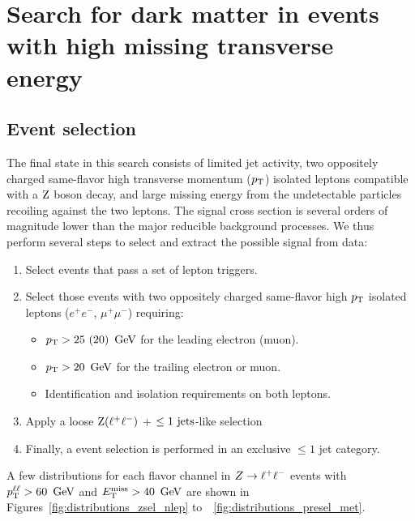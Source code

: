 \chapter{Search for dark matter in events with high missing transverse energy}
\section{Event selection}
The final state in this search consists of limited jet activity, 
two oppositely charged same-flavor high transverse momentum ($p_{\mathrm{T}}$) isolated leptons
compatible with a $\mathrm{Z}$ boson decay, and large missing energy from the undetectable
particles recoiling against the two leptons.
The signal cross section is several orders of magnitude lower than the major reducible
background processes. We thus perform several steps to select and extract the
possible signal from data:
\begin{enumerate}
  \setlength\itemsep{0em}
    \item Select events that pass a set of lepton triggers.
    \item Select those events with two oppositely charged same-flavor high
    $p_{\mathrm{T}}$ isolated leptons ($e^+ e^-$, $\mu^+ \mu^-$) requiring:
      \begin{itemize}
          \setlength\itemsep{0em}
    	  \item $p_{\mathrm{T}}>25\ (20)~\,\text{Ge\hspace{-.08em}V}$ for the leading electron (muon).
    	  \item $p_{\mathrm{T}}>20~\,\text{Ge\hspace{-.08em}V}$ for the trailing electron or muon.
    	  \item Identification and isolation requirements
    	  on both leptons.
      \end{itemize}
    \item Apply a loose $\mathrm{Z}(\ell^+\ell^-)$ + $\leq 1~{\rm jets}$-like selection
    \item Finally, a event selection is performed in an exclusive $\leq 1$ jet category.
\end{enumerate}
A few distributions for each flavor channel in $Z\to\ell^+\ell^-$ events with 
$p_{\mathrm{T}}^{\ell\ell} > 60~\,\text{Ge\hspace{-.08em}V}$ and $E_\mathrm{T}^{\mathrm{miss}} > 40~\,\text{Ge\hspace{-.08em}V}$ are shown in 
Figures~\ref{fig:distributions_zsel_nlep} to~~\ref{fig:distributions_presel_met}.

